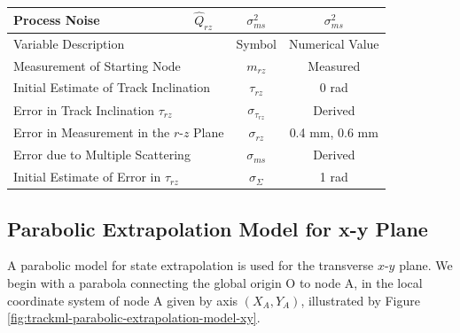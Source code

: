 \begin{table}[!t]
\begin{center}
\begin{tabular}{lccc}
Process Noise
& $\hat{Q}_{rz}$ 
& $\sigma_{ms}^2$
& $\sigma_{ms}^2$
\\  

\bottomrule

\multicolumn{2}{l}{Variable Description} 
& Symbol & Numerical Value  \\
\hline

\multicolumn{2}{l}{Measurement of Starting Node} 
& $m_{rz}$ & Measured \\

\multicolumn{2}{l}{Initial Estimate of Track Inclination} 
& $\tau_{rz}$ & 0 rad \\

\multicolumn{2}{l}{Error in Track Inclination $\tau_{rz}$} 
& $\sigma_{\tau_{rz}}$ & Derived \\

\multicolumn{2}{l}{Error in Measurement in the $r$-$z$ Plane} 
& $\sigma_{rz}$ & 0.4 mm, 0.6 mm  \\

\multicolumn{2}{l}{Error due to Multiple Scattering} 
& $\sigma_{ms}$ & Derived \\

\multicolumn{2}{l}{Initial Estimate of Error in $\tau_{rz}$} 
& $\sigma_{\Sigma}$ & 1 rad \\

              

\bottomrule

\end{tabular}
\end{center}
\label{tab:kf-instance-variables-rz}
\end{table}








\clearpage
\subsection{Parabolic Extrapolation Model for x-y Plane}
\label{chapter-6-start-of-derivation}

A parabolic model for state extrapolation is used for the transverse $x$-$y$ plane. We begin with a parabola connecting the global origin O to node A, in the local coordinate system of node A given by axis $(X_A, Y_A)$, illustrated by Figure \ref{fig:trackml-parabolic-extrapolation-model-xy}.


